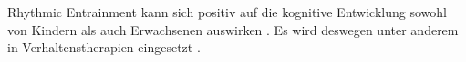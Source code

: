 \documentclass{article}
\begin{document}
Rhythmic Entrainment kann sich positiv auf die kognitive Entwicklung sowohl von
Kindern als auch Erwachsenen auswirken \citet{smas}. Es wird
deswegen unter anderem in Verhaltenstherapien eingesetzt \cites{smas, smas}. \citeauthor{smas}
\printbibliography
\end{document}
